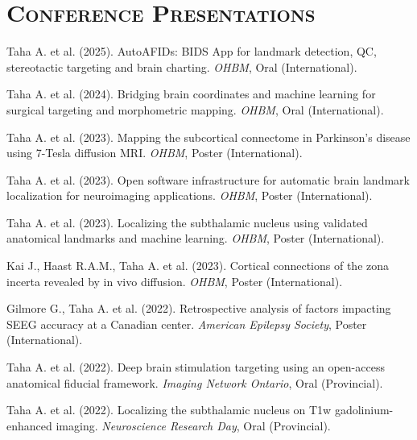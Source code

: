 \section*{\textsc{Conference Presentations}} \noindent\hrulefill \vspace{0.5em}
    \item Taha A. et al. (2025). AutoAFIDs: BIDS App for landmark detection, QC, stereotactic targeting and brain charting. \textit{OHBM}, Oral (International).
    \item Taha A. et al. (2024). Bridging brain coordinates and machine learning for surgical targeting and morphometric mapping. \textit{OHBM}, Oral (International).
    \item Taha A. et al. (2023). Mapping the subcortical connectome in Parkinson’s disease using 7-Tesla diffusion MRI. \textit{OHBM}, Poster (International).
    \item Taha A. et al. (2023). Open software infrastructure for automatic brain landmark localization for neuroimaging applications. \textit{OHBM}, Poster (International).
    \item Taha A. et al. (2023). Localizing the subthalamic nucleus using validated anatomical landmarks and machine learning. \textit{OHBM}, Poster (International).
    \item Kai J., Haast R.A.M., Taha A. et al. (2023). Cortical connections of the zona incerta revealed by in vivo diffusion. \textit{OHBM}, Poster (International).
    \item Gilmore G., Taha A. et al. (2022). Retrospective analysis of factors impacting SEEG accuracy at a Canadian center. \textit{American Epilepsy Society}, Poster (International).
    \item Taha A. et al. (2022). Deep brain stimulation targeting using an open-access anatomical fiducial framework. \textit{Imaging Network Ontario}, Oral (Provincial).
    \item Taha A. et al. (2022). Localizing the subthalamic nucleus on T1w gadolinium-enhanced imaging. \textit{Neuroscience Research Day}, Oral (Provincial).
